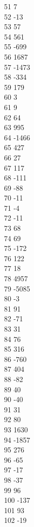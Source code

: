 { 51	7 \\
 52	-13 \\
 53	57 \\
 54	561 \\
 55	-699 \\
 56	1687 \\
 57	-1473 \\
 58	-334 \\
 59	179 \\
 60	3 \\
 61	9 \\
 62	64 \\
 63	995 \\
 64	-1466 \\
 65	427 \\
 66	27 \\
 67	117 \\
 68	-111 \\
 69	-88 \\
 70	-11 \\
 71	-4 \\
 72	-11 \\
 73	68 \\
 74	69 \\
 75	-172 \\
 76	122 \\
 77	18 \\
 78	4957 \\
 79	-5085 \\
 80	-3 \\
 81	91 \\
 82	-71 \\
 83	31 \\
 84	76 \\
 85	316 \\
 86	-760 \\
 87	404 \\
 88	-82 \\
 89	40 \\
 90	-40 \\
 91	31 \\
 92	80 \\
 93	1630 \\
 94	-1857 \\
 95	276 \\
 96	-65 \\
 97	-17 \\
 98	-37 \\
 99	96 \\
 100	-137 \\
 101	93 \\
 102	-19 \\
}
